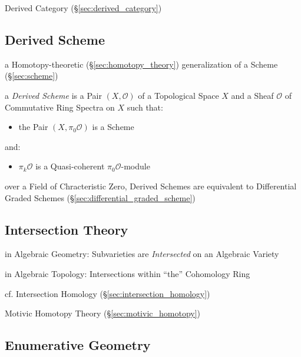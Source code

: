 Derived Category (\S\ref{sec:derived_category})



\subsection{Derived Scheme}\label{sec:derived_scheme}

a Homotopy-theoretic (\S\ref{sec:homotopy_theory}) generalization of a Scheme
(\S\ref{sec:scheme})

a \emph{Derived Scheme} is a Pair $(X, \mathcal{O})$ of a Topological Space $X$
and a Sheaf $\mathcal{O}$ of Commutative Ring Spectra on $X$ such that:
\begin{itemize}
\item the Pair $(X, \pi_0\mathcal{O})$ is a Scheme
\end{itemize}
and:
\begin{itemize}
\item $\pi_k\mathcal{O}$ is a Quasi-coherent $\pi_0\mathcal{O}$-module
\end{itemize}

over a Field of Chracteristic Zero, Derived Schemes are equivalent to
Differential Graded Schemes (\S\ref{sec:differential_graded_scheme})



\subsection{Intersection Theory}\label{sec:intersection_theory}

in Algebraic Geometry: Subvarieties are \emph{Intersected} on an
Algebraic Variety

in Algebraic Topology: Intersections within ``the'' Cohomology Ring

\fist cf. Intersection Homology (\S\ref{sec:intersection_homology})

\fist Motivic Homotopy Theory (\S\ref{sec:motivic_homotopy})



\subsection{Enumerative Geometry}\label{sec:enumerative_geometry}




